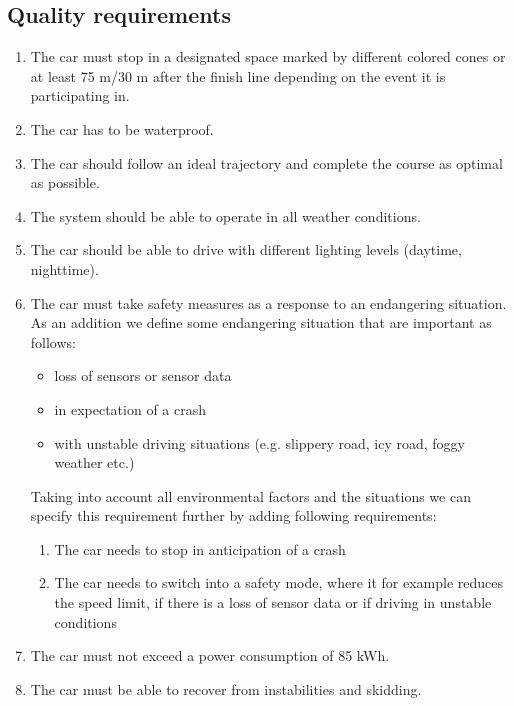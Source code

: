 \documentclass[12pt,a4paper,german]{article}
\begin{document}
    \subsection{Quality requirements}
    \begin{enumerate}[label=\arabic*.]
        \item The car must stop in a designated space marked by different colored cones or at least 75 m/30 m after the finish line depending on the event it is participating in. %
        \item The car has to be waterproof.
        \item The car should follow an ideal trajectory and complete the course as optimal as possible.
        \item The system should be able to operate in all weather conditions.
        \item The car should be able to drive with different lighting levels (daytime, nighttime).
        \item The car must take safety measures as a response to an endangering situation. As an addition we define some endangering situation that are important as follows: 
        \begin{itemize}
            \item loss of sensors or sensor data
            \item in expectation of a crash
            \item with unstable driving situations (e.g. slippery road, icy road, foggy weather etc.)
        \end{itemize}
        Taking into account all environmental factors and the situations we can specify this requirement further by adding following requirements: 
        \begin{enumerate}[label=6.\arabic*.]
            \item The car needs to stop in anticipation of a crash
            \item The car needs to switch into a safety mode, where it for example reduces the speed limit, if there is a loss of sensor data or if driving in unstable conditions 
        \end{enumerate}
        \item The car must not exceed a power consumption of 85 kWh.
        \item The car must be able to recover from instabilities and skidding.
    \end{enumerate}
\end{document}
